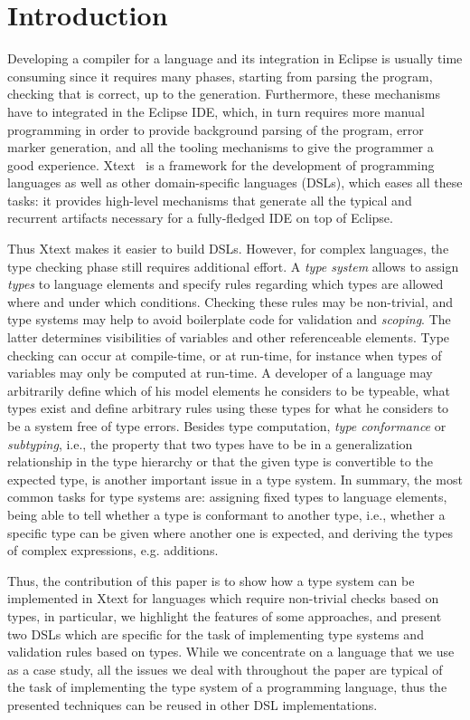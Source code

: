 \section{Introduction}
\label{sec:introduction}

Developing a compiler for a language and its integration in Eclipse is usually
time consuming since it requires many phases, starting from parsing the program,
checking that is correct, up to the generation.  Furthermore, these mechanisms
have to integrated in the Eclipse IDE, which, in turn requires more manual
programming in order to provide background parsing of the program, error marker
generation, and all the tooling mechanisms to give the programmer a good
experience.  Xtext~\cite{xtext} is a framework for the development of
programming languages as well as other domain-specific languages (DSLs), which eases all
these tasks: it provides high-level mechanisms that generate all the typical and
recurrent artifacts necessary for a fully-fledged IDE on top of Eclipse.

Thus Xtext makes it easier to build DSLs.  However, for complex languages, the
type checking phase still requires additional effort.
A \emph{type system} allows to assign \emph{types} to language elements and
specify rules regarding which types are allowed where and under which
conditions.
Checking these rules may be non-trivial, and type systems may help to avoid
boilerplate code for validation and \emph{scoping}. The latter determines
visibilities of variables and other referenceable elements.
Type checking can occur at compile-time, or at run-time, for instance when types
of variables may only be computed at run-time.   A developer of a language may
arbitrarily define which of his model elements he considers to be typeable, what
types exist and define arbitrary rules using these types for what he considers
to be a system free of type errors.
Besides type computation, \emph{type conformance} or \emph{subtyping}, i.e., the
property that two types have to be in a generalization relationship in the type
hierarchy or that the given type is convertible to the expected type, is another
important issue in a type system.
In summary, the most common tasks for type systems are:
assigning fixed types to language elements, being able to tell whether a type is
conformant to another type, i.e., whether a specific type can be given where
another one is expected, and deriving the types of complex expressions, e.g.
additions.

Thus, the contribution of this paper is to show how a type system can be
implemented in Xtext for languages which require non-trivial checks based on
types, in particular, we highlight the features of some approaches, and present
two DSLs which are specific for the task of implementing type systems and
validation rules based on types.  While we concentrate on a language that we use
as a case study, all the issues we deal with throughout the paper are typical of
the task of implementing the type system of a programming language, thus the
presented techniques can be reused in other DSL implementations.

